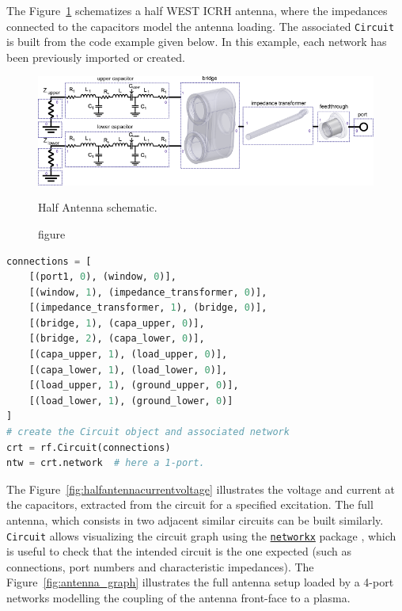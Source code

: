 {The Figure~\ref{fig:antenna_circuit} schematizes a half WEST ICRH antenna, where the impedances connected to the capacitors model the antenna loading. The associated \texttt{Circuit} is built from the code example given below. In this example, each network has been previously imported or created. 

\begin{figure}
	\centering
	\includegraphics[width=.95\linewidth]{figures/chap3/WEST_ICRH/antenna_circuit}
	\caption{figure}{Half Antenna schematic.}
	\label{fig:antenna_circuit}
\end{figure}

\begin{lstlisting}[language=Python, basicstyle=\footnotesize]
connections = [
	[(port1, 0), (window, 0)],
	[(window, 1), (impedance_transformer, 0)],
	[(impedance_transformer, 1), (bridge, 0)],
	[(bridge, 1), (capa_upper, 0)],
	[(bridge, 2), (capa_lower, 0)],
	[(capa_upper, 1), (load_upper, 0)],
	[(capa_lower, 1), (load_lower, 0)],
	[(load_upper, 1), (ground_upper, 0)],
	[(load_lower, 1), (ground_lower, 0)]
]
# create the Circuit object and associated network
crt = rf.Circuit(connections) 
ntw = crt.network  # here a 1-port.			
\end{lstlisting}

The Figure~\ref{fig:halfantennacurrentvoltage} illustrates the voltage and current at the capacitors, extracted from the circuit for a specified excitation. The full antenna, which consists in two adjacent similar circuits can be built similarly. \texttt{Circuit} allows visualizing the circuit graph using the \href{https://networkx.github.io/}{\texttt{networkx}} package , which is useful to check that the intended circuit is the one expected (such as connections, port numbers and characteristic impedances). The Figure~\ref{fig:antenna_graph} illustrates the full antenna setup loaded by a 4-port networks modelling the coupling of the antenna front-face to a plasma.

}
